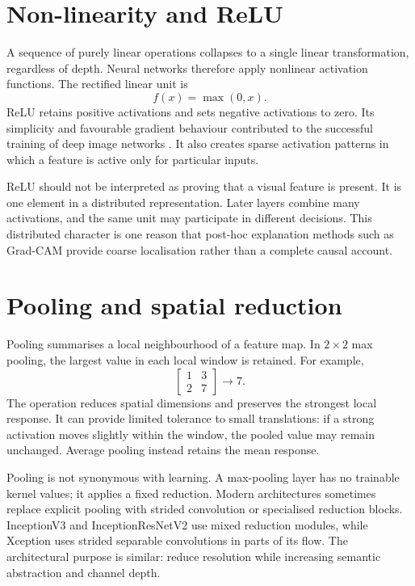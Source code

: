 \section{Non-linearity and ReLU}
A sequence of purely linear operations collapses to a single linear transformation, regardless of depth. Neural networks therefore apply nonlinear activation functions. The rectified linear unit is
\begin{equation}
f(x)=\max(0,x).
\end{equation}
ReLU retains positive activations and sets negative activations to zero. Its simplicity and favourable gradient behaviour contributed to the successful training of deep image networks \citep{nair2010rectified,krizhevsky2012imagenet}. It also creates sparse activation patterns in which a feature is active only for particular inputs.

ReLU should not be interpreted as proving that a visual feature is present. It is one element in a distributed representation. Later layers combine many activations, and the same unit may participate in different decisions. This distributed character is one reason that post-hoc explanation methods such as Grad-CAM provide coarse localisation rather than a complete causal account.

\section{Pooling and spatial reduction}
Pooling summarises a local neighbourhood of a feature map. In $2\times2$ max pooling, the largest value in each local window is retained. For example,
\begin{equation}
\begin{bmatrix}1&3\\2&7\end{bmatrix}\longrightarrow 7.
\end{equation}
The operation reduces spatial dimensions and preserves the strongest local response. It can provide limited tolerance to small translations: if a strong activation moves slightly within the window, the pooled value may remain unchanged. Average pooling instead retains the mean response.

Pooling is not synonymous with learning. A max-pooling layer has no trainable kernel values; it applies a fixed reduction. Modern architectures sometimes replace explicit pooling with strided convolution or specialised reduction blocks. InceptionV3 and InceptionResNetV2 use mixed reduction modules, while Xception uses strided separable convolutions in parts of its flow. The architectural purpose is similar: reduce resolution while increasing semantic abstraction and channel depth.

